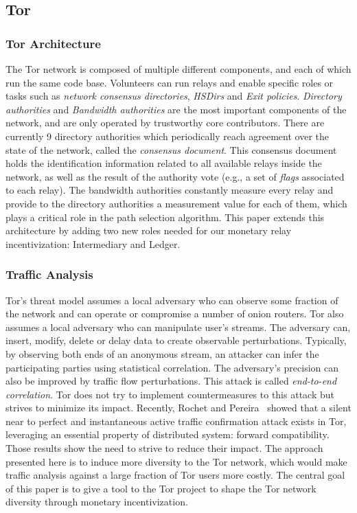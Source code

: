 \subsection{Tor}

\subsubsection{Tor Architecture}
The Tor network is composed of multiple different components, and each of which
run the same code base. Volunteers can run relays and enable specific roles or
tasks such as \textit{network consensus directories}, \textit{HSDirs} and
\textit{Exit policies}. \textit{Directory authorities} and \textit{Bandwidth
  authorities} are the most important components of the network, and are only
operated by trustworthy core contributors. There are currently 9 directory
authorities which periodically reach agreement over the state of the network,
called the \textit{consensus document}. This consensus document holds the
identification information related to all available relays inside the network,
as well as the result of the authority vote (e.g., a set of \textit{flags}
associated to each relay). The bandwidth authorities constantly measure every
relay and provide to the directory authorities a measurement value for each of
them, which plays a critical role in the path selection algorithm. This paper
extends this architecture by adding two new roles needed for our monetary relay
incentivization: Intermediary and Ledger.
\subsubsection{Traffic Analysis}
Tor's threat model assumes a local adversary who can observe some fraction of
the network and can operate or compromise a number of onion routers. Tor also
assumes a local adversary who can manipulate user's streams. The adversary can,
insert, modify, delete or delay data to create observable
perturbations. Typically, by observing both ends of an anonymous stream, an
attacker can infer the participating parties using statistical correlation. The
adversary's precision can also be improved by traffic flow perturbations. This
attack is called \textit{end-to-end correlation}. Tor does not try to implement
countermeasures to this attack but strives to minimize its impact. Recently,
Rochet and Pereira~\cite{popets-dropping} showed that a silent near to perfect
and instantaneous active traffic confirmation attack exists in Tor, leveraging
an essential property of distributed system: forward compatibility. Those
results show the need to strive to reduce their impact. The approach presented
here is to induce more diversity to the Tor network, which would make traffic
analysis against a large fraction of Tor users more costly. The central goal of
this paper is to give a tool to the Tor project to shape the Tor network
diversity through monetary incentivization.

